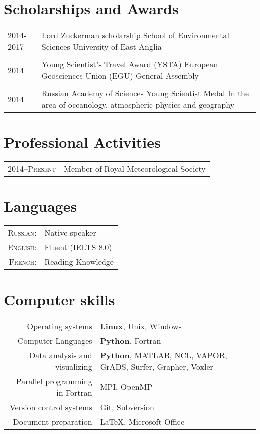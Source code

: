 \documentclass[a4paper,10pt]{article}
\newlength{\mycol}
\begin{document}
\section{Scholarships and Awards}
\begin{tabu} to 	
 \textsc{2014-2017} & Lord Zuckerman scholarship
                    \newline School of Environmental Sciences
                    \newline University of East Anglia \\
  \\
 \textsc{2014} & Young Scientist's Travel Award (YSTA)
                 \newline European Geosciences Union (EGU) General Assembly \\
  \\
 \textsc{2014} & Russian Academy of Sciences Young Scientist Medal
                 \newline In the area of oceanology, atmospheric physics and geography
\end{tabu}

\section{Professional Activities}
\begin{tabu} to 	
 \textsc{2014--\small{Present}} & Member of Royal Meteorological Society
\end{tabu}

\section{Languages}
\begin{tabular}{rp{10cm}}
\textsc{Russian:} & Native speaker \\
\textsc{English:} & Fluent (IELTS 8.0)\\
\textsc{French:} & Reading Knowledge\\
\end{tabular}

\section{Computer skills}
\begin{tabular}{rp{10cm}}
	Operating systems & \textbf{Linux}, Unix, Windows \\
	Computer Languages & \textbf{Python}, Fortran \\
	Data analysis and visualizing & \textbf{Python}, MATLAB, NCL, VAPOR, GrADS, Surfer, Grapher, Voxler \\
	Parallel programming in Fortran & MPI, OpenMP \\
	Version control systems & Git, Subversion \\
	Document preparation & \LaTeX, Microsoft Office \\
\end{tabular}
\end{document}
